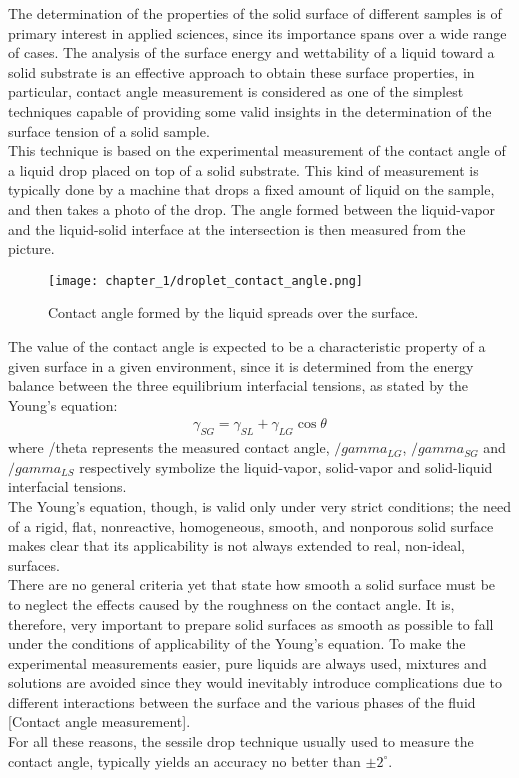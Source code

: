 The determination of the properties of the solid surface of different samples is of primary interest in applied sciences, since its importance spans over a wide range of cases. The analysis of the surface energy and wettability of a liquid toward a solid substrate is an effective approach to obtain these surface properties, in particular, contact angle measurement is considered as one of the simplest techniques capable of providing some valid insights in the determination of the surface tension of a solid sample.
\\
This technique is based on the experimental measurement of the contact angle of a liquid drop placed on top of a solid substrate. This kind of measurement is typically done by a machine that drops a fixed amount of liquid on the sample, and then takes a photo of the drop. The angle formed between the liquid-vapor and the liquid-solid interface at the intersection is then measured from the picture.
\begin{figure}[H]
    \centering
    \texttt{[image: chapter\_1/droplet\_contact\_angle.png]}
    \vspace*{10pt}
    \caption{Contact angle formed by the liquid spreads over the surface. }
    \label{fig:contact_angle_example}
\end{figure}
The value of the contact angle is expected to be a characteristic property of a given surface in a given environment, since it is determined from the energy balance between the three equilibrium interfacial tensions, as stated by the Young’s equation:
\begin{align}
    \gamma_{SG} = \gamma_{SL} + \gamma_{LG} \cos\theta \label{eq:young_equation}
\end{align}
where /theta represents the measured contact angle, $/gamma_{LG}$, $/gamma_{SG}$ and $/gamma_{LS}$ respectively symbolize the liquid-vapor, solid-vapor and solid-liquid interfacial tensions.
\\
The Young’s equation, though, is valid only under very strict conditions; the need of a rigid, flat, nonreactive, homogeneous, smooth, and nonporous solid surface makes clear that its applicability is not always extended to real, non-ideal, surfaces.
\\
There are no general criteria yet that state how smooth a solid surface must be to neglect the effects caused by the roughness on the contact angle. It is, therefore, very important to prepare solid surfaces as smooth as possible to fall under the conditions of applicability of the Young’s equation. To make the experimental measurements easier, pure liquids are always used, mixtures and solutions are avoided since they would inevitably introduce complications due to different interactions between the surface and the various phases of the fluid [Contact angle measurement].
\\
For all these reasons, the sessile drop technique usually used to measure the contact angle, typically yields an accuracy no better than $\pm 2^\circ$.

